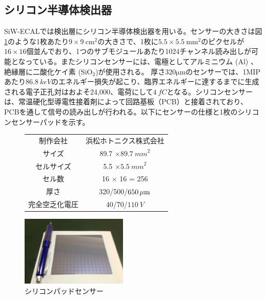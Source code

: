 \subsection{シリコン半導体検出器}
SiW-ECALでは検出層にシリコン半導体検出器を用いる。センサーの大きさは図\ref{sensor}のような1枚あたり$9 \times 9\: \mathrm{{cm}^2}$の大きさで、1枚に$5.5 \times 5.5\: {\mathrm{mm}^2}$のピクセルが$16 \times 16$個並んでおり、1つのサブモジュールあたり1024チャンネル読み出しが可能となっている。またシリコンセンサーには、電極としてアルミニウム ($\mathrm{Al}$) 、絶縁層に二酸化ケイ素 ($\mathrm{SiO_2}$)が使用される。 厚さ320$\mathrm{\mu m}$のセンサーでは、1MIPあたり$\SI{86.8}{keV}$のエネルギー損失が起こり、臨界エネルギーに達するまでに生成される電子正孔対はおよそ24,000、電荷にして$\SI{4}{fC}$となる。シリコンセンサーは、常温硬化型導電性接着剤によって回路基板（PCB）と接着されており、PCBを通して信号の読み出しが行われる。以下にセンサーの仕様と1枚のシリコンセンサーパッドを示す。
\begin{figure}[H]
 \begin{minipage}[h]{.45\linewidth}
 \def\@captype{table}
   \centering
   \begin{tabular}{|c|c|}
         \hline
   	制作会社 & 浜松ホトニクス株式会社\\
	サイズ & 89.7 $\times \SI{89.7}{mm}^2 $ \\
	セルサイズ & 5.5 $\times \SI{5.5}{mm}^2 $\\
	セル数 & 16 $\times$ 16 = 256\\
	厚さ & 320/500/$650\, \mu \rm{m}$\\
	完全空乏化電圧 & 40/70/$\SI{110}{V}$\\
        \hline
  \end{tabular}
\end{minipage}
\hfill
\begin{minipage}[h]{.45\linewidth}
	\begin{center}
 \includegraphics[keepaspectratio, scale=0.8]
 	{Figure/Siwecal/si_sensor.png}
 		\caption[シリコンパッドセンサー]{シリコンパッドセンサー~\cite{sipad}}
 		\label{sensor}
	\end{center}
\end{minipage}
\end{figure}
